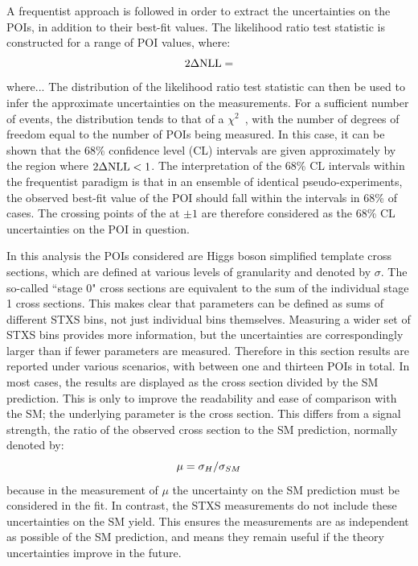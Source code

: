 A frequentist approach is followed in order to extract the uncertainties on the POIs, 
in addition to their best-fit values.
The likelihood ratio test statistic is constructed for a range of POI values, where:
\begin{equation}
\textrm{\ensuremath{2\Delta\textrm{NLL}}} = 
\end{equation}
where...
The distribution of the likelihood ratio test statistic 
can then be used to infer the approximate uncertainties on the measurements.
For a sufficient number of events, %
the distribution tends to that of a $\chi^2$~\cite{Asymptotic}, with the number of degrees of freedom
equal to the number of POIs being measured.
In this case, it can be shown that the 68\% confidence level (CL) intervals 
are given approximately by the region where $2\Delta\textrm{NLL} < 1$.
The interpretation of the 68\% CL intervals within the frequentist paradigm 
is that in an ensemble of identical pseudo-experiments, 
the observed best-fit value of the POI should fall within the intervals in 68\% of cases.
The crossing points of the \dNLL at $\pm 1$ are therefore considered 
as the 68\% CL uncertainties on the POI in question.

In this analysis the POIs considered are Higgs boson simplified template cross sections, 
which are defined at various levels of granularity and denoted by $\sigma$.
The so-called ``stage 0" cross sections are equivalent 
to the sum of the individual stage 1 cross sections.
This makes clear that parameters can be defined as sums of different STXS bins, 
not just individual bins themselves.
Measuring a wider set of STXS bins provides more information, 
but the uncertainties are correspondingly larger than if fewer parameters are measured.
Therefore in this section results are reported under various scenarios, 
with between one and thirteen POIs in total.
In most cases, the results are displayed as the cross section divided by the SM prediction. 
This is only to improve the readability and ease of comparison with the SM;
the underlying parameter is the cross section.
This differs from a signal strength, the ratio of the observed cross section 
to the SM prediction, normally denoted by:
\begin{equation}
\mu = \sigma_{H} / \sigma_{SM}
\end{equation}
because in the measurement of $\mu$ 
the uncertainty on the SM prediction must be considered in the fit. 
In contrast, the STXS measurements do not include these uncertainties on the SM yield.
This ensures the measurements are as independent as possible of the SM prediction, 
and means they remain useful if the theory uncertainties improve in the future.


